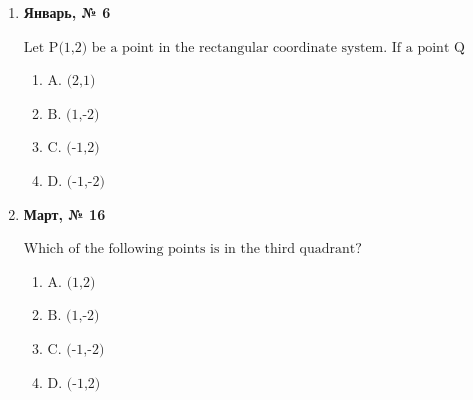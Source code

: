 \begin{enumerate}
\begin{enumerate}
\item $\displaystyle \text{C.  Second quadrant}$
\item $\displaystyle \text{D.  Fourth quadrant}$
\end{enumerate}
\item \textbf{Январь, № 6} \par \smallskip
$\displaystyle \text{Let P(1,2) be a point in the rectangular coordinate system. If a point Q together with P are symmetrical about the x axis, then the coordinates of Q are ( ).}$
\begin{enumerate}
\item $\displaystyle \text{A. (2,1)}$
\item $\displaystyle \text{B. (1,-2)}$
\item $\displaystyle \text{C. (-1,2)}$
\item $\displaystyle \text{D. (-1,-2)}$
\end{enumerate}
\item \textbf{Март, № 16} \par \smallskip
$\displaystyle \text{Which of the following points is in the third quadrant?}$
\begin{enumerate}
\item $\displaystyle \text{A. (1,2)}$
\item $\displaystyle \text{B. (1,-2)}$
\item $\displaystyle \text{C. (-1,-2)}$
\item $\displaystyle \text{D. (-1,2)}$
\end{enumerate}
\end{enumerate}

